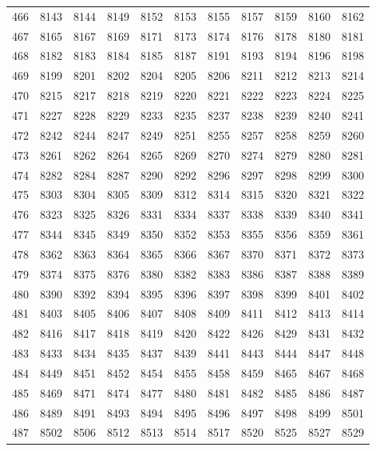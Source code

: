 \begin{longtable}{|r|rrrrrrrrrr|}
  466 & 8143 & 8144 & 8149 & 8152 & 8153 & 8155 & 8157 & 8159 & 8160 & 8162 \\ 
  467 & 8165 & 8167 & 8169 & 8171 & 8173 & 8174 & 8176 & 8178 & 8180 & 8181 \\ 
  468 & 8182 & 8183 & 8184 & 8185 & 8187 & 8191 & 8193 & 8194 & 8196 & 8198 \\ 
  469 & 8199 & 8201 & 8202 & 8204 & 8205 & 8206 & 8211 & 8212 & 8213 & 8214 \\ 
  470 & 8215 & 8217 & 8218 & 8219 & 8220 & 8221 & 8222 & 8223 & 8224 & 8225 \\ 
  471 & 8227 & 8228 & 8229 & 8233 & 8235 & 8237 & 8238 & 8239 & 8240 & 8241 \\ 
  472 & 8242 & 8244 & 8247 & 8249 & 8251 & 8255 & 8257 & 8258 & 8259 & 8260 \\ 
  473 & 8261 & 8262 & 8264 & 8265 & 8269 & 8270 & 8274 & 8279 & 8280 & 8281 \\ 
  474 & 8282 & 8284 & 8287 & 8290 & 8292 & 8296 & 8297 & 8298 & 8299 & 8300 \\ 
  475 & 8303 & 8304 & 8305 & 8309 & 8312 & 8314 & 8315 & 8320 & 8321 & 8322 \\ 
  476 & 8323 & 8325 & 8326 & 8331 & 8334 & 8337 & 8338 & 8339 & 8340 & 8341 \\ 
  477 & 8344 & 8345 & 8349 & 8350 & 8352 & 8353 & 8355 & 8356 & 8359 & 8361 \\ 
  478 & 8362 & 8363 & 8364 & 8365 & 8366 & 8367 & 8370 & 8371 & 8372 & 8373 \\ 
  479 & 8374 & 8375 & 8376 & 8380 & 8382 & 8383 & 8386 & 8387 & 8388 & 8389 \\ 
  480 & 8390 & 8392 & 8394 & 8395 & 8396 & 8397 & 8398 & 8399 & 8401 & 8402 \\ 
  481 & 8403 & 8405 & 8406 & 8407 & 8408 & 8409 & 8411 & 8412 & 8413 & 8414 \\ 
  482 & 8416 & 8417 & 8418 & 8419 & 8420 & 8422 & 8426 & 8429 & 8431 & 8432 \\ 
  483 & 8433 & 8434 & 8435 & 8437 & 8439 & 8441 & 8443 & 8444 & 8447 & 8448 \\ 
  484 & 8449 & 8451 & 8452 & 8454 & 8455 & 8458 & 8459 & 8465 & 8467 & 8468 \\ 
  485 & 8469 & 8471 & 8474 & 8477 & 8480 & 8481 & 8482 & 8485 & 8486 & 8487 \\ 
  486 & 8489 & 8491 & 8493 & 8494 & 8495 & 8496 & 8497 & 8498 & 8499 & 8501 \\ 
  487 & 8502 & 8506 & 8512 & 8513 & 8514 & 8517 & 8520 & 8525 & 8527 & 8529 \\ 

\end{longtable}
